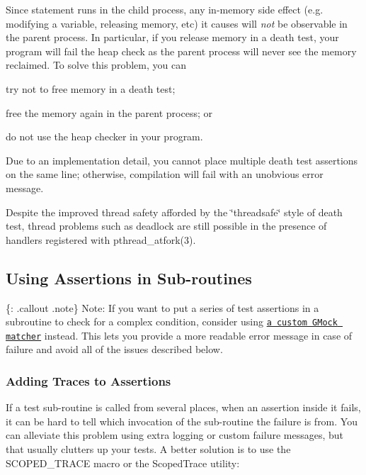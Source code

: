 Since {\ttfamily statement} runs in the child process, any in-\/memory side effect (e.\+g. modifying a variable, releasing memory, etc) it causes will {\itshape not} be observable in the parent process. In particular, if you release memory in a death test, your program will fail the heap check as the parent process will never see the memory reclaimed. To solve this problem, you can


\begin{DoxyEnumerate}
\item try not to free memory in a death test;
\item free the memory again in the parent process; or
\item do not use the heap checker in your program.
\end{DoxyEnumerate}

Due to an implementation detail, you cannot place multiple death test assertions on the same line; otherwise, compilation will fail with an unobvious error message.

Despite the improved thread safety afforded by the \char`\"{}threadsafe\char`\"{} style of death test, thread problems such as deadlock are still possible in the presence of handlers registered with {\ttfamily pthread\+\_\+atfork(3)}.

\subsection*{Using Assertions in Sub-\/routines}

\{\+: .callout .note\} Note\+: If you want to put a series of test assertions in a subroutine to check for a complex condition, consider using \href{gmock_cook_book.md#NewMatchers}{\tt a custom G\+Mock matcher} instead. This lets you provide a more readable error message in case of failure and avoid all of the issues described below.

\subsubsection*{Adding Traces to Assertions}

If a test sub-\/routine is called from several places, when an assertion inside it fails, it can be hard to tell which invocation of the sub-\/routine the failure is from. You can alleviate this problem using extra logging or custom failure messages, but that usually clutters up your tests. A better solution is to use the {\ttfamily S\+C\+O\+P\+E\+D\+\_\+\+T\+R\+A\+CE} macro or the {\ttfamily Scoped\+Trace} utility\+:


